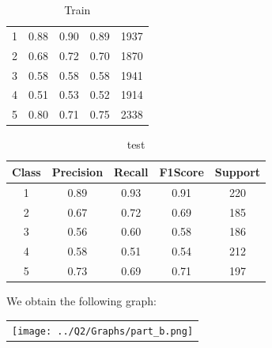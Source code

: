 \begin{enumerate}[label=(\alph*)]
\begin{enumerate}[label=\roman*.]
\begin{table}[!htb]
\begin{tabular}{ccccc}
                            1     & 0.88      & 0.90   & 0.89    & 1937    \\
                            2     & 0.68      & 0.72   & 0.70    & 1870    \\
                            3     & 0.58      & 0.58   & 0.58    & 1941    \\
                            4     & 0.51      & 0.53   & 0.52    & 1914    \\
                            5     & 0.80      & 0.71   & 0.75    & 2338    \\ \hline
                        \end{tabular}
                        \caption{Train}
                        \label{part b train depth 100}
                    \end{table}
                    \begin{table}[!htb]
                        \centering
                        \begin{tabular}{ccccc}
                            \hline
                            Class & Precision & Recall & F1Score & Support \\ \hline
                            1     & 0.89      & 0.93   & 0.91    & 220     \\
                            2     & 0.67      & 0.72   & 0.69    & 185     \\
                            3     & 0.56      & 0.60   & 0.58    & 186     \\
                            4     & 0.58      & 0.51   & 0.54    & 212     \\
                            5     & 0.73      & 0.69   & 0.71    & 197     \\ \hline
                        \end{tabular}
                        \caption{test}
                        \label{part b test depth 100}
                    \end{table}

          \end{enumerate}
          We obtain the following graph:
          \begin{center}
              \begin{tabular}{c}
                  \texttt{[image: ../Q2/Graphs/part\_b.png]}
              \end{tabular}
          \end{center}


\end{enumerate}
